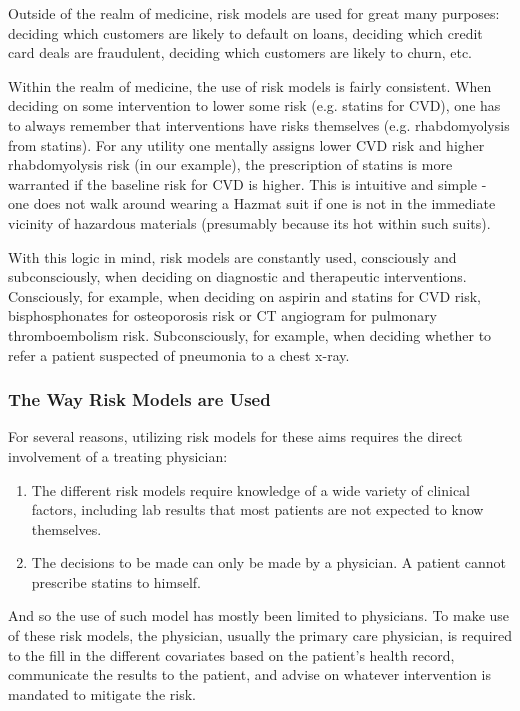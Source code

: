 \documentclass[a4paper,12pt]{article}
\begin{document}
			Outside of the realm of medicine, risk models are used for great many purposes: deciding which customers are likely to default on loans, deciding which credit card deals are fraudulent, deciding which customers are likely to churn, etc.
			
			Within the realm of medicine, the use of risk models is fairly consistent. When deciding on some intervention to lower some risk (e.g. statins for CVD), one has to always remember that interventions have risks themselves (e.g. rhabdomyolysis from statins). For any utility one mentally assigns lower CVD risk and higher rhabdomyolysis risk (in our example), the prescription of statins is more warranted if the baseline risk for CVD is higher. This is intuitive and simple - one does not walk around wearing a Hazmat suit if one is not in the immediate vicinity of hazardous materials (presumably because its hot within such suits).
			
			With this logic in mind, risk models are constantly used, consciously and subconsciously, when deciding on diagnostic and therapeutic interventions. Consciously, for example, when deciding on aspirin and statins for CVD risk\cite{Goff2014,Bibbins-Domingo2016}, bisphosphonates for osteoporosis risk \cite{Jeremiah2015} or CT angiogram for pulmonary thromboembolism risk\cite{Wells2001}. Subconsciously, for example, when deciding whether to refer a patient suspected of pneumonia to a chest x-ray.
			
			\subsubsection{The Way Risk Models are Used}
			
			For several reasons, utilizing risk models for these aims requires the direct involvement of a treating physician:
			\begin{enumerate}
				\item The different risk models require knowledge of a wide variety of clinical factors, including lab results that most patients are not expected to know themselves.
				\item The decisions to be made can only be made by a physician. A patient cannot prescribe statins to himself.
			\end{enumerate}
			
			And so the use of such model has mostly been limited to physicians. To make use of these risk models, the physician, usually the primary care physician, is required to the fill in the different covariates based on the patient's health record, communicate the results to the patient, and advise on whatever intervention is mandated to mitigate the risk.
			
\end{document}
